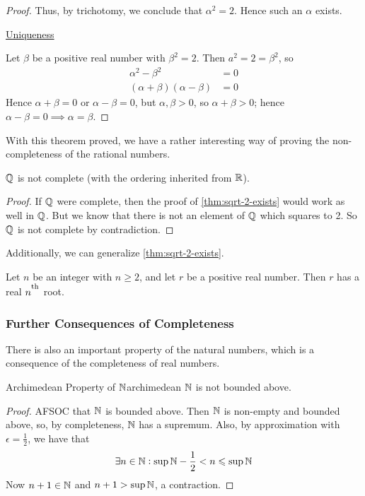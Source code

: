 \documentclass{styles/tufte}
\begin{document}
\begin{proof}
        Thus, by trichotomy, we conclude that $\alpha^2 = 2$. Hence such an $\alpha$ exists.
        
        {\flushleft\underline{Uniqueness}}
        
        Let $\beta$ be a positive real number with $\beta^2 = 2$. Then $a^2 = 2 = \beta^2$, so
        \begin{align*}
          \alpha^2 - \beta^2 &= 0 \\
          (\alpha + \beta) (\alpha - \beta) &= 0
        \end{align*}
        Hence $\alpha + \beta = 0$ or $\alpha - \beta = 0$, but $\alpha, \beta > 0$, so $\alpha + \beta > 0$; hence $\alpha - \beta = 0 \implies \alpha = \beta$.
      \end{proof}
      
      With this theorem proved, we have a rather interesting way of proving the non-completeness of the rational numbers.
      
      \begin{theorem}{}{}
        $\mathbb{Q}$ is not complete (with the ordering inherited from $\mathbb{R}$).
      \end{theorem}
      \begin{proof}
        If $\mathbb{Q}$ were complete, then the proof of \cref{thm:sqrt-2-exists} would work as well in $\mathbb{Q}$. But we know that there is not an element of $\mathbb{Q}$ which squares to 2. So $\mathbb{Q}$ is not complete by contradiction.
      \end{proof}
      
      Additionally, we can generalize \cref{thm:sqrt-2-exists}.
      
      \begin{theorem}{}{}
        Let $n$ be an integer with $n \geqslant 2$, and let $r$ be a positive real number. Then $r$ has a real $n^\textsuperscript{th}$ root.
      \end{theorem}
    
    \subsubsection{Further Consequences of Completeness}
      
      There is also an important property of the natural numbers, which is a consequence of the completeness of real numbers.
      
      \begin{theorem}{Archimedean Property of $\mathbb{N}$}{archimedean}
        $\mathbb{N}$ is not bounded above.
      \end{theorem}
      \begin{proof}
        AFSOC that $\mathbb{N}$ is bounded above. Then $\mathbb{N}$ is non-empty and bounded above, so, by completeness, $\mathbb{N}$ has a supremum. Also, by approximation with $\epsilon = \frac{1}{2}$, we have that
        \[ \exists n \in \mathbb{N} : \sup\mathbb{N} - \frac{1}{2} < n \leqslant \sup\mathbb{N} \]
        Now $n + 1 \in \mathbb{N}$ and $n + 1 > \sup\mathbb{N}$, a contraction.
      \end{proof}
      
\end{document}
